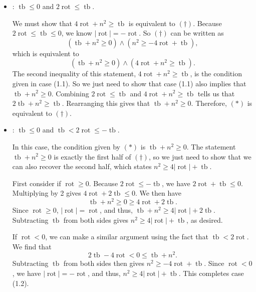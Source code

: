 \documentclass{article}
\DeclareMathOperator{\tb}{tb}
\DeclareMathOperator{\rot}{rot}
\begin{document}
\begin{itemize}

\item[\textbf{Case (1.1)}]: $\tb\leq0$ and $2 \rot \leq \tb$.

We must show that $4 \rot + n^2 \geq \tb$ is equivalent to $(\dagger)$. Because $2\rot\leq\tb\leq0$, we know $|\rot|=-\rot$. So $(\dagger)$ can be written as $$(\tb+n^2\geq0)\wedge(n^2\geq-4\rot+\tb),$$
which is equivalent to $$(\tb+n^2\geq0)\wedge(4\rot+n^2\geq\tb).$$
The second inequality of this statement, $4\rot+n^2\geq\tb$, is the condition given in case (1.1). So we just need to show that case (1.1) also implies that $\tb+n^2\geq0$. Combining $2\rot\leq\tb$ and $4\rot+n^2\geq\tb$ tells us that $2\tb+n^2\geq \tb$. Rearranging this gives that $\tb+n^2\geq0$. Therefore, $(*)$ is equivalent to $(\dagger)$.

\item[\textbf{Case (1.2)}]:  $\tb\leq0$ and $\tb<2\rot\leq-\tb$.

In this case, the condition given by $(*)$ is $\tb+n^2\geq0$. The statement $\tb+n^2\geq0$ is exactly the first half of $(\dagger)$, so we just need to show that we can also recover the second half, which states $n^2\geq4|\rot|+\tb$. 

First consider if $\rot\geq0$. Because $2\rot\leq-\tb$, we have $2\rot+\tb\leq0$. Multiplying by 2 gives $4\rot+2\tb\leq0$. We then have
$$\tb+n^2\geq0\geq4\rot+2\tb.$$
Since $\rot\geq0$, $|\rot|=\rot$, and thus, 
$\tb+n^2\geq4|\rot|
+2\tb$. Subtracting $\tb$ from both sides gives $n^2\geq4|\rot|+\tb$, as desired.

If $\rot<0$, we can make a similar argument using the fact that $\tb<2\rot$. We find that
$$2\tb-4\rot<0\leq\tb+n^2.$$
Subtracting $\tb$ from both sides then gives $n^2\geq-4\rot+\tb$. Since $\rot<0$, we have $|\rot|=-\rot$, and thus, $n^2\geq4|\rot|+\tb$. This completes case (1.2).


\end{itemize}
\end{document}

